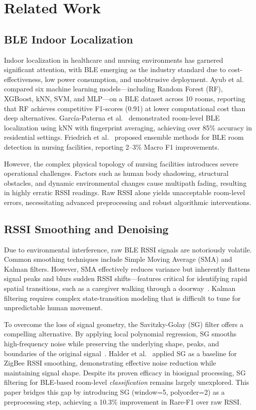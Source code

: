 \section{Related Work}

\subsection{BLE Indoor Localization}

Indoor localization in healthcare and nursing environments has garnered significant attention, with BLE emerging as the industry standard due to cost-effectiveness, low power consumption, and unobtrusive deployment. Ayub et al.~\cite{ayub2025} compared six machine learning models—including Random Forest (RF), XGBoost, kNN, SVM, and MLP—on a BLE dataset across 10 rooms, reporting that RF achieves competitive F1-scores (0.91) at lower computational cost than deep alternatives. García-Paterna et al.~\cite{garcia2021} demonstrated room-level BLE localization using kNN with fingerprint averaging, achieving over 85\% accuracy in residential settings. Friedrich et al.~\cite{friedrich2024} proposed ensemble methods for BLE room detection in nursing facilities, reporting 2–3\% Macro F1 improvements.

However, the complex physical topology of nursing facilities introduces severe operational challenges. Factors such as human body shadowing, structural obstacles, and dynamic environmental changes cause multipath fading, resulting in highly erratic RSSI readings. Raw RSSI alone yields unacceptable room-level errors, necessitating advanced preprocessing and robust algorithmic interventions.

\subsection{RSSI Smoothing and Denoising}

Due to environmental interference, raw BLE RSSI signals are notoriously volatile. Common smoothing techniques include Simple Moving Average (SMA) and Kalman filters. However, SMA effectively reduces variance but inherently flattens signal peaks and blurs sudden RSSI shifts—features critical for identifying rapid spatial transitions, such as a caregiver walking through a doorway~\cite{hou2017}. Kalman filtering requires complex state-transition modeling that is difficult to tune for unpredictable human movement.

To overcome the loss of signal geometry, the Savitzky-Golay (SG) filter offers a compelling alternative. By applying local polynomial regression, SG smooths high-frequency noise while preserving the underlying shape, peaks, and boundaries of the original signal~\cite{savitzky1964}. Halder et al.~\cite{halder2015} applied SG as a baseline for ZigBee RSSI smoothing, demonstrating effective noise reduction while maintaining signal shape. Despite its proven efficacy in biosignal processing, SG filtering for BLE-based room-level \emph{classification} remains largely unexplored. This paper bridges this gap by introducing SG (window=5, polyorder=2) as a preprocessing step, achieving a 10.3\% improvement in Rare-F1 over raw RSSI.

